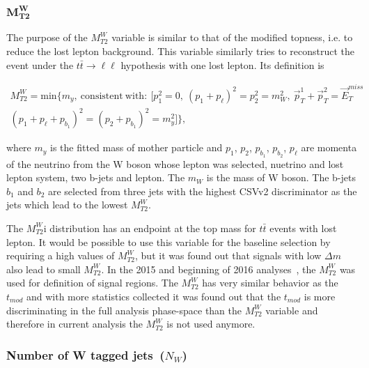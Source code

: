 \subsubsection{$\mathbf{M_{T2}^{W}}$~\label{sec:mt2wsec:mt2w}}

The purpose of the $M_{T2}^{W}$ variable is similar to that of the modified topness, i.e. to reduce the lost lepton background. This variable similarly tries to reconstruct the event under the $t \bar{t} \to \ell \ell$ hypothesis with one lost lepton. Its definition is

\begin{equation}
\begin{split}
M_{T2}^{W} = \mathrm{min}\{m_{y},~\mathrm{consistent~with:}~[p_{1}^{2}=0,~(p_{1}+p_{\ell})^{2} = p_{2}^{2} =m_{W}^{2},~ \vec{p}_{T}^{1}+\vec{p}_{T}^{2}= \vec{E}_{T}^{miss} \\
(p_{1} + p_{\ell} + p_{b_{1}})^{2} =  (p_{2} + p_{b_{1}})^{2} = m_{y}^{2}]\},
\end{split}
\end{equation}

where $m_{y}$ is the fitted mass of mother particle and $p_{1}$, $p_{2}$, $p_{b_{1}}$, $p_{b_{2}}$, $p_{\ell}$ are momenta of the neutrino from the W boson whose lepton was selected, nuetrino and lost lepton system, two b-jets and lepton. The $m_{W}$ is the mass of W boson. The b-jets $b_{1}$ and $b_{2}$ are selected from three jets with the highest CSVv2 discriminator as the jets which lead to the lowest $M_{T2}^{W}$.

The $M_{T2}^{W}$i distribution has an endpoint at the top mass for $t\bar{t}$ events with lost lepton. It would be possible to use this variable for the baseline selection by requiring a high values of $M_{T2}^{W}$, but it was found out that signals with low $\Delta m$ also lead to small $M_{T2}^{W}$. In the 2015 and beginning of 2016 analyses~\cite{Sirunyan:2016jpr, CMS:2016vew}, the $M_{T2}^{W}$ was used for definition of signal regions. The $M_{T2}^{W}$ has very similar behavior as the $t_{mod}$ and with more statistics collected it was found out that the $t_{mod}$ is more discriminating in the full analysis phase-space than the $M_{T2}^{W}$ variable and therefore in current analysis the $M_{T2}^{W}$ is not used anymore.


\subsubsection{Number of W tagged jets~($N_{W}$)}

